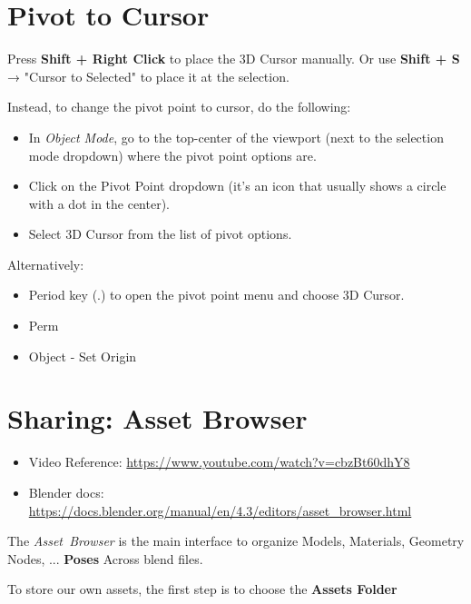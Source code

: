 \documentclass{article}
\begin{document}
\section{Pivot to Cursor}
Press \textbf{Shift + Right Click} to place the 3D Cursor manually.  Or use \textbf{Shift + S} → "Cursor to Selected" to place it at the selection.\par
Instead, to change the pivot point to cursor, do the following:
\begin{itemize}[topsep=0pt, noitemsep]
    \item In \textit{Object Mode}, go to the top-center of the viewport (next to the selection mode dropdown) where the pivot point options are.
    \item Click on the Pivot Point dropdown (it's an icon that usually shows a circle with a dot in the center).
    \item Select 3D Cursor from the list of pivot options.
\end{itemize}
Alternatively:
\begin{itemize}[topsep=0pt, noitemsep]
    \item Period key (.) to open the pivot point menu and choose 3D Cursor.
    \item Perm
    \item Object - Set Origin
\end{itemize}

\section{Sharing: Asset Browser}\label{asset:browser}
\begin{itemize}[noitemsep, topsep=0pt]
    \item Video Reference: \url{https://www.youtube.com/watch?v=cbzBt60dhY8}
    \item Blender docs: \url{https://docs.blender.org/manual/en/4.3/editors/asset_browser.html}
\end{itemize}
The \mbox{\textit{Asset Browser}} is the main interface to organize Models, Materials, Geometry Nodes, ... \textbf{Poses} Across blend files.\par
To store our own assets, the first step is to choose the \textbf{Assets Folder}
\end{document}

